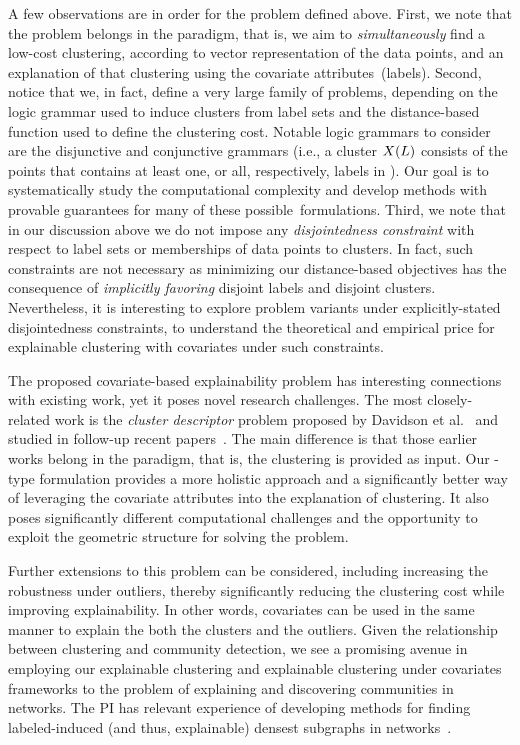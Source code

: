 \documentclass[a4paper,11pt]{article}
\begin{document}
A few observations are in order for the problem defined above.
First, we note that the problem belongs in the \joint paradigm, 
that is, we aim to \emph{simultaneously} find a low-cost clustering, 
according to vector representation of the data points,
and an explanation of that clustering using the covariate attributes~(labels).
%
Second, notice that we, in fact, define a very large family of problems, 
depending on the logic grammar used to induce clusters from label sets
and the distance-based function used to define the clustering cost.
Notable logic grammars to consider are the disjunctive and conjunctive grammars 
(i.e., a cluster $X({L})$ consists of the points 
that contains at least one, or all, respectively, labels in ).
Our goal is to systematically study the computational complexity and 
develop methods with provable guarantees
for many of these possible~formulations.
%
Third, we note that in our discussion above we do not impose any
\emph{disjointedness constraint} with respect to label sets or 
memberships of data points to clusters. 
In fact, such constraints are not necessary as minimizing 
our distance-based objectives has the consequence of \emph{implicitly favoring}
disjoint labels and disjoint clusters.
Nevertheless, it is interesting to explore problem variants
under explicitly-stated disjointedness constraints,
to understand the theoretical and empirical price for explainable clustering with covariates under such constraints.

The proposed covariate-based explainability problem
has interesting connections with existing work, yet it poses novel research challenges.
The most closely-related work is the \emph{cluster descriptor} problem
proposed by Davidson et al.~\cite{davidson2018cluster} 
and studied in follow-up recent papers~\citep{sambaturu2020efficient}.
The main difference is that those earlier works belong in the \posthoc paradigm, 
that is, the clustering is provided as input. 
Our \joint-type formulation provides a more holistic approach and a
significantly better way of leveraging the covariate attributes into the explanation of clustering. 
It also poses significantly different computational challenges
and the opportunity to exploit the geometric structure for solving the problem.

Further extensions to this problem can be considered, including increasing the robustness under outliers, thereby significantly reducing the clustering cost while improving explainability.
In other words, covariates can be used in the same manner
to explain the both the clusters and the outliers.
Given the relationship between clustering and community detection,
we see a promising avenue in employing our explainable clustering and explainable clustering under covariates frameworks to the problem of explaining and discovering communities in networks.
The PI has relevant experience of developing methods for finding labeled-induced
(and thus, explainable) densest subgraphs in networks~\cite{galbrun2014overlapping}.
\end{document}
